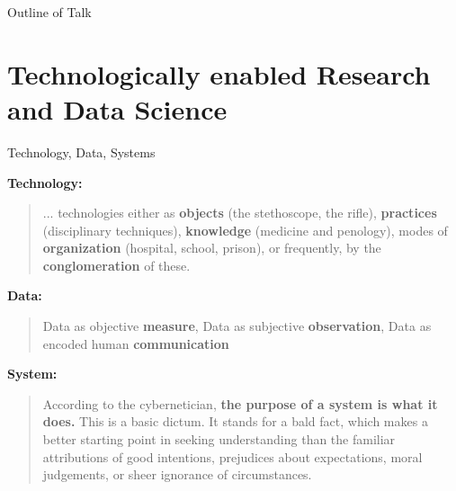 \documentclass[aspectratio=1610, 11pt]{beamer} %
\begin{document}
\begin{frame}{Outline of Talk}
  \tableofcontents
\end{frame}



\section{Technologically enabled Research and Data Science}

\begin{frame}{Technology, Data, Systems}

\textbf{Technology:} \begin{quote}
... technologies either as
\textbf{objects} (the stethoscope, the rifle), \textbf{practices} (disciplinary techniques), \textbf{knowledge} (medicine and penology), modes of \textbf{organization} (hospital, school, prison), or frequently,
by the \textbf{conglomeration} of these. \parencite{Lagdameo2019-sa}
\end{quote} 

\textbf{Data:}
\begin{quote}
Data as objective \textbf{measure}, Data as subjective \textbf{observation}, Data as encoded human \textbf{communication} \parencite{Ballsun-Stanton2012-nx}
\end{quote}

\textbf{System:}
\begin{quote}
According to the
cybernetician, \textbf{the purpose of a system is what it does.} This is a basic dictum. It stands for a
bald fact, which makes a better starting point in seeking understanding than the familiar
attributions of good intentions, prejudices about expectations, moral judgements, or sheer
ignorance of circumstances. \parencite{Beer2002-tl}
\end{quote} 
\end{frame}
\end{document}
